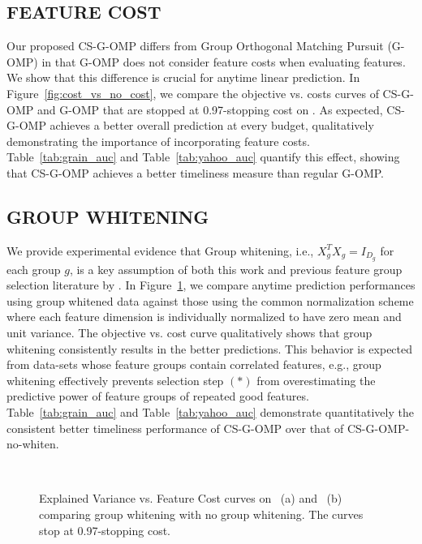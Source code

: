 \subsection{FEATURE COST}
Our proposed CS-G-OMP differs from Group Orthogonal Matching Pursuit (G-OMP) \citep{gomp} in that G-OMP does not consider feature costs when evaluating features. We show that this difference is crucial for anytime linear prediction. In Figure~\ref{fig:cost_vs_no_cost}, we compare the objective vs. costs curves of CS-G-OMP and G-OMP that are stopped at 0.97-stopping cost on \YahooLTR. As expected, CS-G-OMP achieves a
better overall prediction at every budget, qualitatively demonstrating the importance of incorporating feature costs. Table~\ref{tab:grain_auc} and Table~\ref{tab:yahoo_auc} 
quantify this effect, showing that CS-G-OMP 
achieves a better timeliness
measure than regular G-OMP. 

\subsection{GROUP WHITENING}
We provide experimental evidence that  
Group whitening, i.e., $X_g^TX_g = I_{D_g}$ for each group $g$, is a key assumption of both this work and previous feature group selection literature  by \cite{gomp, log_gomp}.
In Figure~\ref{fig:whiten_vs_no_whiten}, we compare 
anytime prediction performances using group whitened data 
against those using the common  
normalization scheme where each feature dimension
is individually normalized to have zero mean and unit variance. 
The objective vs. cost curve qualitatively shows that group whitening consistently results in the better predictions.
This behavior is expected from data-sets whose feature groups contain correlated features, e.g., group whitening effectively prevents selection step $(*)$ from overestimating the predictive power of feature groups of repeated good features. Table~\ref{tab:grain_auc} and Table~\ref{tab:yahoo_auc} demonstrate quantitatively the consistent better timeliness performance of CS-G-OMP over that of CS-G-OMP-no-whiten. 


\begin{figure}[ht!]
\centering
{}
~
\caption{Explained Variance vs. Feature Cost curves on \Grain\, (a) and \YahooLTR\, (b)  comparing group whitening with no group whitening. The curves stop at 0.97-stopping cost.}
\label{fig:whiten_vs_no_whiten}
\end{figure}


